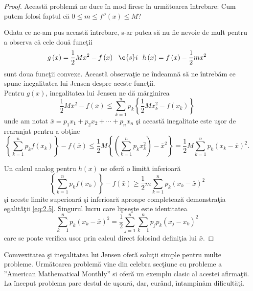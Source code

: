 \documentclass[a4paper,12pt,oneside]{report}
\begin{document}
\begin{proof}
Aceast\u{a} problem\u{a} ne duce \^{i}n mod firesc la urm\u{a}toarea \^{i}ntrebare: Cum putem folosi faptul c\u{a} \(0\leq m\leq {f}''\left ( x \right )\leq M \)?

Odata ce ne-am pus aceast\u{a} \^{i}ntrebare, s-ar putea s\u{a} nu fie nevoie de mult pentru a observa c\u{a} cele dou\u{a} func\c{t}ii
\begin{displaymath}
  g\left ( x \right ) = \frac{1}{2}Mx^{2} - f\left ( x \right )~~ \c{s}i~~
h\left ( x \right ) = f\left ( x \right ) - \frac{1}{2}mx^{2}
\end{displaymath}
sunt doua func\c{t}ii convexe.
Aceast\u{a} observa\c{t}ie ne \^{i}ndeamn\u{a} s\u{a} ne \^{i}ntreb\u{a}m ce spune inegalitatea lui Jensen despre aceste func\c{t}ii.\\
Pentru \(g\left ( x \right )\), inegalitatea lui Jensen ne d\u{a} m\u{a}rginirea
\begin{displaymath}
  \frac{1}{2}M\bar{x}^{2} - f\left ( \bar{x} \right )\leq \sum_{k = 1}^{n}p_{k}\left \{ \frac{1}{2}Mx_{k}^{2} - f\left ( x_{k} \right )\right \}
\end{displaymath}
unde am notat \(\bar{x} = p_{1}x_{1}+ p_{2}x_{2}+ \cdots + p_{n}x_{n}\) \c{s}i aceast\u{a} inegalitate este u\c{s}or de rearanjat  pentru a ob\c{t}ine
\begin{displaymath}
  \left \{ \sum_{k = 1}^{n} p_{k}f\left ( x_{k} \right )\right \} - f\left (\bar{x}  \right )\leq \frac{1}{2}M\left \{ \left ( \sum_{k=1}^{n} p_{k}x_{k}^{2}\right ) - \bar{x}^{2} \right \} = \frac{1}{2}M\sum_{k = 1}^{n}p_{k}\left ( x_{k} - \bar{x} \right )^{2}.
\end{displaymath}

Un calcul analog pentru  \(h\left ( x \right )\) ne ofer\u{a} o limit\u{a} inferioar\u{a}
\begin{displaymath}
  \left \{ \sum_{k = 1}^{n} p_{k}f\left ( x_{k} \right )\right \} - f\left (\bar{x}  \right )\geq \frac{1}{2}m\sum_{k = 1}^{n}p_{k}\left ( x_{k} - \bar{x} \right )^{2}
\end{displaymath}
\c{s}i aceste limite superioar\u{a} \c{s}i inferioar\u{a} aproape completeaz\u{a} demonstra\c{t}ia egalit\u{a}\c{t}ii  \ref{eq:2.5}. Singurul lucru care lipse\c{s}te este identitatea
\begin{displaymath}
  \sum_{k = 1}^{n}p_{k}\left ( x_{k} - \bar{x} \right )^{2} = \frac{1}{2}\sum_{j = 1}^{n}\sum_{k = 1}^{n} p _{j}p_{k}\left ( x_{j} - x_{k} \right )^{2}
\end{displaymath}
care se poate verifica usor prin calcul direct folosind defini\c{t}ia lui \(\bar{x}\).
\end{proof}
Comvexitatea \c{s}i inegalitatea lui Jensen ofer\u{a} solu\c{t}ii simple pentru multe probleme.
	Urm\u{a}toarea problem\u{a} vine din celebra sec\c{t}iune cu probleme a ”American Mathematical Monthly” si ofer\u{a} un exemplu clasic al acestei afirma\c{t}ii.
	La \^{i}nceput problema pare destul de u\c{s}oar\u{a}, dar, cur\^{a}nd, \^{i}ntampin\u{a}m dificult\u{a}\c{t}i.
\end{document}
